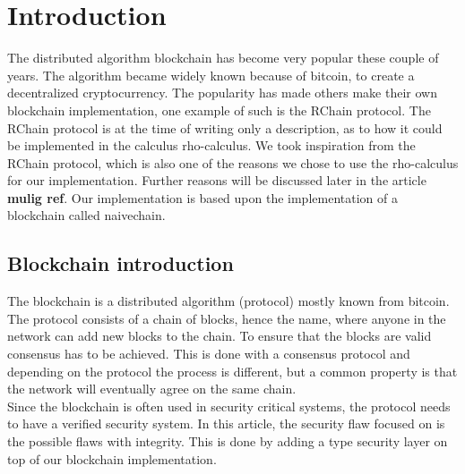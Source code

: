 \section{Introduction}
The distributed algorithm blockchain has become very popular these couple of years. The algorithm became widely known because of bitcoin, to create a decentralized cryptocurrency. The popularity has made others make their own blockchain implementation, one example of such is the RChain protocol. The RChain protocol is at the time of writing only a description, as to how it could be implemented in the calculus rho-calculus. We took inspiration from the RChain protocol, which is also one of the reasons we chose to use the rho-calculus for our implementation. Further reasons will be discussed later in the article \textbf{mulig ref}. Our implementation is based upon the implementation of a blockchain called naivechain\cite{naivechain}.

\subsection*{Blockchain introduction}
The blockchain is a distributed algorithm (protocol) mostly known from bitcoin. The protocol consists of a chain of blocks, hence the name, where anyone in the network can add new blocks to the chain. To ensure that the blocks are valid consensus has to be achieved. This is done with a consensus protocol and depending on the protocol the process is different, but a common property is that the network will eventually agree on the same chain.\\
Since the blockchain is often used in security critical systems, the protocol needs to have a verified security system. In this article, the security flaw focused on is the possible flaws with integrity. This is done by adding a type security layer on top of our blockchain implementation.
